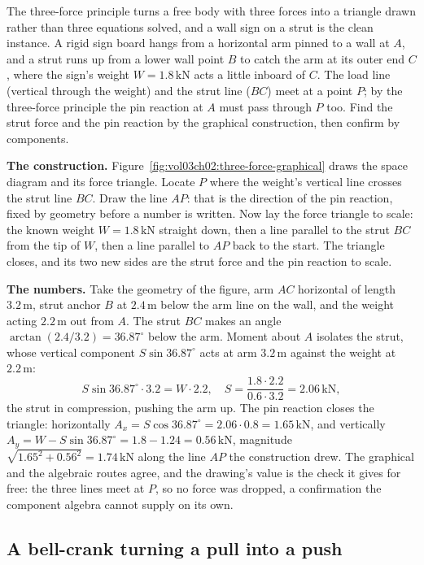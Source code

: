 The three-force principle turns a free body with three forces into a triangle
drawn rather than three equations solved, and a wall sign on a strut is the
clean instance. A rigid sign board hangs from a horizontal arm pinned to a wall
at $A$, and a strut runs up from a lower wall point $B$ to catch the arm at its
outer end $C$, where the sign's weight $W = 1.8\,\text{kN}$ acts a little
inboard of $C$. The load line (vertical through the weight) and the strut line
($BC$) meet at a point $P$; by the three-force principle the pin reaction at $A$
must pass through $P$ too. Find the strut force and the pin reaction by the
graphical construction, then confirm by components.

\textbf{The construction.} Figure~\ref{fig:vol03ch02:three-force-graphical}
draws the space diagram and its force triangle. Locate $P$ where the weight's
vertical line crosses the strut line $BC$. Draw the line $AP$: that is the
direction of the pin reaction, fixed by geometry before a number is written.
Now lay the force triangle to scale: the known weight $W = 1.8\,\text{kN}$
straight down, then a line parallel to the strut $BC$ from the tip of $W$, then
a line parallel to $AP$ back to the start. The triangle closes, and its two new
sides are the strut force and the pin reaction to scale.

\textbf{The numbers.} Take the geometry of the figure, arm $AC$ horizontal of
length $3.2\,\si{\meter}$, strut anchor $B$ at $2.4\,\si{\meter}$ below the arm
line on the wall, and the weight acting $2.2\,\si{\meter}$ out from $A$. The
strut $BC$ makes an angle $\arctan(2.4/3.2) = 36.87^\circ$ below the arm. Moment
about $A$ isolates the strut, whose vertical component $S\sin 36.87^\circ$ acts
at arm $3.2\,\si{\meter}$ against the weight at $2.2\,\si{\meter}$:
\[
S\sin 36.87^\circ \cdot 3.2 = W \cdot 2.2, \quad
S = \frac{1.8 \cdot 2.2}{0.6 \cdot 3.2} = 2.06\,\text{kN},
\]
the strut in compression, pushing the arm up. The pin reaction closes the
triangle: horizontally $A_x = S\cos 36.87^\circ = 2.06 \cdot 0.8 =
1.65\,\text{kN}$, and vertically $A_y = W - S\sin 36.87^\circ = 1.8 - 1.24 =
0.56\,\text{kN}$, magnitude $\sqrt{1.65^2 + 0.56^2} = 1.74\,\text{kN}$ along the
line $AP$ the construction drew. The graphical and the algebraic routes agree,
and the drawing's value is the check it gives for free: the three lines meet at
$P$, so no force was dropped, a confirmation the component algebra cannot supply
on its own.

\subsection{A bell-crank turning a pull into a push}

